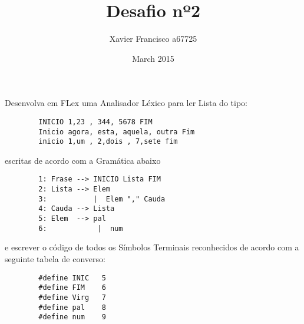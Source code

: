 \documentclass{article}
\title{Desafio nº2}
\author{Xavier Francisco a67725}
\date{March 2015}
\begin{document}
    \maketitle

    Desenvolva em FLex uma Analisador Léxico para ler Lista do tipo:
    
    
    \begin{verbatim}
        INICIO 1,23 , 344, 5678 FIM
        Inicio agora, esta, aquela, outra Fim
        inicio 1,um , 2,dois , 7,sete fim
    \end{verbatim}
    
    escritas de acordo com a Gramática abaixo
     
    \begin{verbatim}     
        1: Frase --> INICIO Lista FIM     
        2: Lista --> Elem     
        3:           |  Elem "," Cauda     
        4: Cauda --> Lista     
        5: Elem  --> pal     
        6:            |  num 
    \end{verbatim}
     
    e escrever o código de todos os Símbolos Terminais reconhecidos de acordo com a seguinte tabela de converso:
     
    \begin{verbatim}     
        #define INIC   5     
        #define FIM    6     
        #define Virg   7     
        #define pal    8     
        #define num    9 
    \end{verbatim}
    
\end{document}
